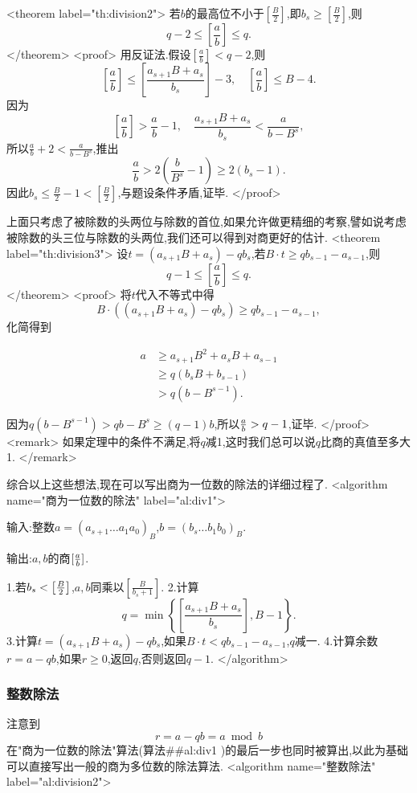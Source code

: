 \documentclass{ctexart}
\begin{document}
<theorem label="th:division2">
若$b$的最高位不小于$\left[\frac{B}{2}\right]$,即$b_s\ge\left[\frac{B}{2}\right]$,则$$q-2\le\left[\frac{a}{b}\right]\le q.$$
</theorem>
<proof>
用反证法.假设$\left[\frac{a}{b}\right]<q-2$,则$$\left[\frac{a}{b}\right]\le\left[\frac{a_{s+1}B+a_s}{b_s}\right]-3,\quad\left[\frac{a}{b}\right] \le B-4.$$
因为$$\left[\frac{a}{b}\right]>\frac{a}{b}-1,\quad\frac{a_{s+1}B+a_s}{b_s}<\frac{a}{b-B^s},$$所以$\frac{a}{b}+2<\frac{a}{b-B^s}$,推出$$\frac{a}{b}>2(\frac{b}{B^s}-1)\ge 2(b_s-1).$$因此$b_s \le \frac{B}{2}-1<\left[\frac{B}{2}\right]$,与题设条件矛盾,证毕.
</proof>

上面只考虑了被除数的头两位与除数的首位,如果允许做更精细的考察,譬如说考虑被除数的头三位与除数的头两位,我们还可以得到对商更好的估计.
<theorem label="th:division3">
设$t=(a_{s+1}B+a_s)-qb_s$,若$B\cdot t\ge qb_{s-1}-a_{s-1}$,则$$q-1\le\left[\frac{a}{b}\right]\le q.$$
</theorem>
<proof>
将$t$代入不等式中得$$B\cdot((a_{s+1}B+a_s)-qb_s)\ge qb_{s-1}-a_{s-1},$$化简得到

\begin{align*}
a&\ge a_{s+1}B^2+a_sB+a_{s-1}\\
&\ge q(b_sB+b_{s-1})\\
&>q(b-B^{s-1}).
\end{align*}

因为$q(b-B^{s-1})>qb-B^s\ge(q-1)b$,所以${a\over b}>q-1$,证毕.
</proof>
<remark>
如果定理中的条件不满足,将$q$减1,这时我们总可以说$q$比商的真值至多大1.
</remark>

综合以上这些想法,现在可以写出商为一位数的除法的详细过程了.
<algorithm  name="商为一位数的除法" label="al:div1">

输入:整数$a=(a_{s+1}\ldots a_1a_0)_B$,$b=(b_s\ldots b_1b_0)_B$.

输出:$a,b$的商$[{a\over b}]$.

 1.若$b_s<\left[{B\over 2}\right]$,$a,b$同乘以$\left[\frac{B}{b_s+1}\right]$.
 2.计算$$q = \min\left\{\left[\frac{a_{s+1}B+a_s}{b_s}\right],B-1\right\}.$$
 3.计算$t=(a_{s+1}B+a_s)-qb_s$,如果$B\cdot t<qb_{s-1}-a_{s-1}$,$q$减一.
 4.计算余数$r=a-qb$,如果$r\ge 0$,返回$q$,否则返回$q-1$.
</algorithm>

\subsubsection{整数除法}

注意到$$r=a-qb=a\bmod b$$在"商为一位数的除法"算法(算法##al:div1
)的最后一步也同时被算出,以此为基础可以直接写出一般的商为多位数的除法算法.
<algorithm  name="整数除法" label="al:division2">
\end{document}
